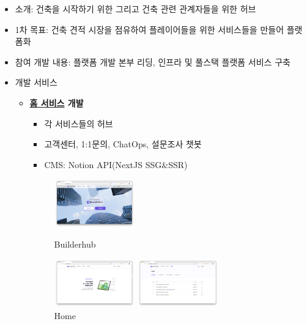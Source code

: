 
\begin{itemize}[label=]
	\item 소개: 건축을 시작하기 위한 그리고 건축 관련 관계자들을 위한 허브
	\item 1차 목표: 건축 견적 시장을 점유하여 플레이어들을 위한 서비스들을 만들어 플랫폼화
	\item 참여 개발 내용: 플랫폼 개발 본부 리딩, 인프라 및 풀스택 플랫폼 서비스 구축
	\item 개발 서비스
	      \begin{itemize}[label=]
		      \item \textbf{\href{https://builderhub.io}{홈 서비스} 개발}
		            \begin{itemize}
			            \item 각 서비스들의 허브
			            \item 고객센터, 1:1문의, ChatOps, 설문조사 챗봇
			            \item CMS: Notion API(NextJS SSG\&SSR)
		            \end{itemize}
		            \begin{figure}[!ht]
			            \begin{fullwidth}
				            \parbox{0.35\textwidth}{
					            \centering
					            \includegraphics[width=0.35\textwidth]{images/builderhub-home-1.png}
					            \caption*{Builderhub}
				            }\qquad
				            \parbox{0.35\textwidth}{
					            \centering
					            \includegraphics[width=0.35\textwidth]{images/builderhub-home-2.png}
					            \caption*{Home}
				            }\qquad
				            \parbox{0.35\textwidth}{
					            \centering
					            \includegraphics[width=0.35\textwidth]{images/builderhub-home-cs-1.png}
}
\end{fullwidth}
\end{figure}
\end{itemize}
\end{itemize}
